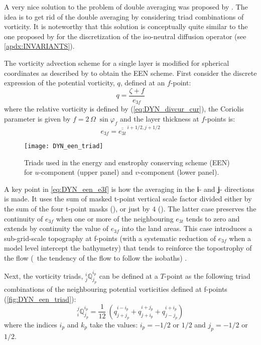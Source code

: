 \documentclass[../main/NEMO_manual]{subfiles}
\begin{document}
A very nice solution to the problem of double averaging was proposed by \citet{arakawa.hsu_MWR90}.
The idea is to get rid of the double averaging by considering triad combinations of vorticity.
It is noteworthy that this solution is conceptually quite similar to the one proposed by
\citep{griffies.gnanadesikan.ea_JPO98} for the discretization of the iso-neutral diffusion operator (see \autoref{apdx:INVARIANTS}).

The \citet{arakawa.hsu_MWR90} vorticity advection scheme for a single layer is modified
for spherical coordinates as described by \citet{arakawa.lamb_MWR81} to obtain the EEN scheme.
First consider the discrete expression of the potential vorticity, $q$, defined at an $f$-point:
\[
  q  = \frac{\zeta +f} {e_{3f} }
\]
where the relative vorticity is defined by (\autoref{eq:DYN_divcur_cur}),
the Coriolis parameter is given by $f=2 \,\Omega \;\sin \varphi _f $ and the layer thickness at $f$-points is:
\begin{equation}
  \label{eq:DYN_een_e3f}
  e_{3f} = \overline{\overline {e_{3t} }} ^{\,i+1/2,j+1/2}
\end{equation}

\begin{figure}[!ht]
  \centering
  \texttt{[image: DYN\_een\_triad]}
  \caption[Triads used in the energy and enstrophy conserving scheme (EEN)]{
    Triads used in the energy and enstrophy conserving scheme (EEN) for
    $u$-component (upper panel) and $v$-component (lower panel).}
  \label{fig:DYN_een_triad}
\end{figure}

A key point in \autoref{eq:DYN_een_e3f} is how the averaging in the \textbf{i}- and \textbf{j}- directions is made.
It uses the sum of masked t-point vertical scale factor divided either by the sum of the four t-point masks
(), or just by $4$ ().
The latter case preserves the continuity of $e_{3f}$ when one or more of the neighbouring $e_{3t}$ tends to zero and
extends by continuity the value of $e_{3f}$ into the land areas.
This case introduces a sub-grid-scale topography at f-points
(with a systematic reduction of $e_{3f}$ when a model level intercept the bathymetry)
that tends to reinforce the topostrophy of the flow
(\ie\ the tendency of the flow to follow the isobaths) \citep{penduff.le-sommer.ea_OS07}.

Next, the vorticity triads, $ {^i_j}\mathbb{Q}^{i_p}_{j_p}$ can be defined at a $T$-point as
the following triad combinations of the neighbouring potential vorticities defined at f-points
(\autoref{fig:DYN_een_triad}):
\begin{equation}
  \label{eq:DYN_Q_triads}
  _i^j \mathbb{Q}^{i_p}_{j_p}
  = \frac{1}{12} \ \left(   q^{i-i_p}_{j+j_p} + q^{i+j_p}_{j+i_p} + q^{i+i_p}_{j-j_p}  \right)
\end{equation}
where the indices $i_p$ and $k_p$ take the values: $i_p = -1/2$ or $1/2$ and $j_p = -1/2$ or $1/2$.
\end{document}
